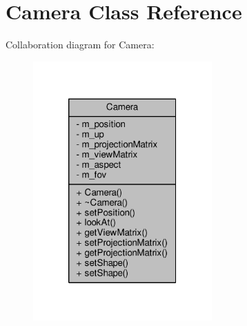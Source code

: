 \hypertarget{class_camera}{\section{Camera Class Reference}
\label{class_camera}
}


Collaboration diagram for Camera\-:
\nopagebreak
\begin{figure}[H]
\begin{center}
\leavevmode
\includegraphics[width=194pt]{class_camera__coll__graph}
\end{center}
\end{figure}
